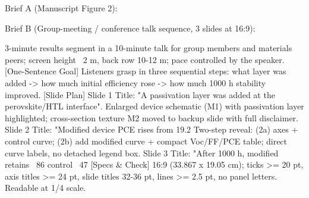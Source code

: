 Brief A (Manuscript Figure 2):

Brief B (Group-meeting / conference talk sequence, 3 slides at 16:9):
\begin{Prompt}
 3-minute results segment in a 10-minute talk for group
members and materials peers; screen height ~2 m, back row 10-12 m; pace
controlled by the speaker.
[One-Sentence Goal] Listeners grasp in three sequential steps: what layer was
added -> how much initial efficiency rose -> how much 1000 h stability improved.
[Slide Plan]
  Slide 1 Title: "A passivation layer was added at the perovskite/HTL interface".
          Enlarged device schematic (M1) with passivation layer highlighted;
          cross-section texture M2 moved to backup slide with full disclaimer.
  Slide 2 Title: "Modified device PCE rises from 19.2%
          Two-step reveal: (2a) axes + control curve; (2b) add modified curve +
          compact Voc/FF/PCE table; direct curve labels, no detached legend box.
  Slide 3 Title: "After 1000 h, modified retains ~86%
          control ~47%
[Specs & Check] 16:9 (33.867 x 19.05 cm); ticks >= 20 pt, axis titles >= 24 pt,
slide titles 32-36 pt, lines >= 2.5 pt, no panel letters. Readable at 1/4 scale.
\end{Prompt}

